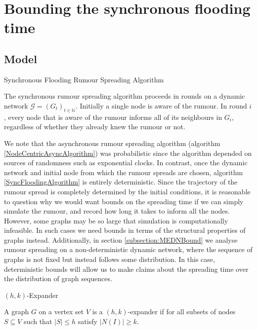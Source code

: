 \section{Bounding the synchronous flooding time}
\label{SyncFloodingSection}

\subsection{Model}

\begin{definition} \label{SyncFloodingAlgorithm}
	Synchronous Flooding Rumour Spreading Algorithm

	\noindent
	The synchronous rumour spreading algorithm proceeds in rounds on a dynamic network $\mathcal{G} = (G_t)_{t \in \mathbb{N}}$. Initially a single node is aware of the rumour. In round $i$, every node that is aware of the rumour informs all of its neighbours in $G_i$, regardless of whether they already knew the rumour or not.
\end{definition}

We note that the asynchronous rumour spreading algorithm (algorithm \ref{NodeCentricAsyncAlgorithm}) was probabilistic since the algorithm depended on sources of randomness such as exponential clocks. In contrast, once the dynamic network and initial node from which the rumour spreads are chosen, algorithm \ref{SyncFloodingAlgorithm} is entirely deterministic. Since the trajectory of the rumour spread is completely determined by the initial conditions, it is reasonable to question why we would want bounds on the spreading time if we can simply simulate the rumour, and record how long it takes to inform all the nodes. However, some graphs may be so large that simulation is computationally infeasible. In such cases we need bounds in terms of the structural properties of graphs instead. Additionally, in section \ref{subsection:MEDNBound}
we analyse rumour spreading on a non-deterministic dynamic network, where the sequence of graphs is not fixed but instead follows some distribution. In this case, deterministic bounds will allow us to make claims about the spreading time over the distribution of graph sequences.


\begin{definition}
	$(h, k)$-Expander

	\noindent
	A graph $G$ on a vertex set $V$ is a $(h, k)$-expander if for all subsets of nodes $S \subseteq V$ such that $|S| \leq h$ satisfy $|N(I)| \geq k$.
\end{definition}

